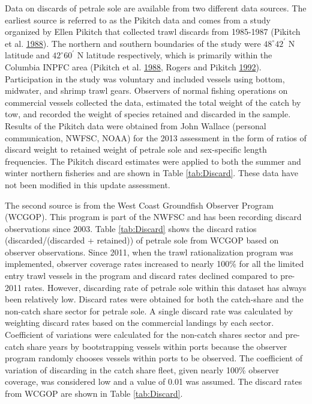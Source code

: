 \documentclass[12pt,]{article}
\begin{document}
Data on discards of petrale sole are available from two different data
sources. The earliest source is referred to as the Pikitch data and
comes from a study organized by Ellen Pikitch that collected trawl
discards from 1985-1987 (Pikitch et al.
\protect\hyperlink{ref-pikitch_evaluation_1988}{1988}). The northern and
southern boundaries of the study were \(48^\circ 42^\prime\) N latitude
and \(42^\circ 60^\prime\) N latitude respectively, which is primarily
within the Columbia INPFC area (Pikitch et al.
\protect\hyperlink{ref-pikitch_evaluation_1988}{1988}, Rogers and
Pikitch \protect\hyperlink{ref-rogers_numerical_1992}{1992}).
Participation in the study was voluntary and included vessels using
bottom, midwater, and shrimp trawl gears. Observers of normal fishing
operations on commercial vessels collected the data, estimated the total
weight of the catch by tow, and recorded the weight of species retained
and discarded in the sample. Results of the Pikitch data were obtained
from John Wallace (personal communication, NWFSC, NOAA) for the 2013
assessment in the form of ratios of discard weight to retained weight of
petrale sole and sex-specific length frequencies. The Pikitch discard
estimates were applied to both the summer and winter northern fisheries
and are shown in Table \ref{tab:Discard}. These data have not been
modified in this update assessment.

The second source is from the West Coast Groundfish Observer Program
(WCGOP). This program is part of the NWFSC and has been recording
discard observations since 2003. Table \ref{tab:Discard} shows the
discard ratios (discarded/(discarded + retained)) of petrale sole from
WCGOP based on observer observations. Since 2011, when the trawl
rationalization program was implemented, observer coverage rates
increased to nearly 100\% for all the limited entry trawl vessels in the
program and discard rates declined compared to pre-2011 rates. However,
discarding rate of petrale sole within this dataset has always been
relatively low. Discard rates were obtained for both the catch-share and
the non-catch share sector for petrale sole. A single discard rate was
calculated by weighting discard rates based on the commercial landings
by each sector. Coefficient of variations were calculated for the
non-catch shares sector and pre-catch share years by bootstrapping
vessels within ports because the observer program randomly chooses
vessels within ports to be observed. The coefficient of variation of
discarding in the catch share fleet, given nearly 100\% observer
coverage, was considered low and a value of 0.01 was assumed. The
discard rates from WCGOP are shown in Table \ref{tab:Discard}.
\end{document}
